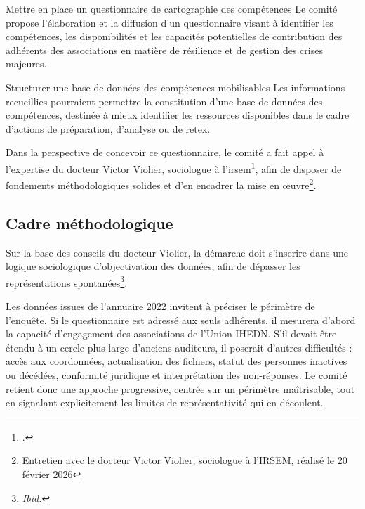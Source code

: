 \documentclass[12pt,a4paper]{article}
\newcommand{\UnionIHEDN}{Union-IHEDN}
\newcommand{\AssociationsUnionIHEDN}{associations de l'\UnionIHEDN}
\begin{document}
\begin{proposition}{Mettre en place un questionnaire de cartographie des compétences}
Le comité propose l'élaboration et la diffusion d'un questionnaire visant à identifier les compétences, les disponibilités et les capacités potentielles de contribution des adhérents des associations en matière de résilience et de gestion des crises majeures.
\end{proposition}

\begin{proposition}{Structurer une base de données des compétences mobilisables}
Les informations recueillies pourraient permettre la constitution d'une base de données des compétences, destinée à mieux identifier les ressources disponibles dans le cadre d'actions de préparation, d'analyse ou de \acrshort{retex}.
\end{proposition}

Dans la perspective de concevoir ce questionnaire, le comité a fait appel à l'expertise du docteur Victor Violier, sociologue à l'\gls{irsem}\footcite{violier_irsem}, afin de disposer de fondements méthodologiques solides et d'en encadrer la mise en \oe{}uvre\footnote{Entretien avec le docteur Victor Violier, sociologue à l'IRSEM, réalisé le 20 février 2026}.

\clearpage

\subsection{Cadre méthodologique}

Sur la base des conseils du docteur Violier, la démarche doit s'inscrire dans une logique sociologique d'objectivation des données, afin de dépasser les représentations spontanées\footnote{\textit{Ibid.}}.

Les données issues de l'annuaire 2022 invitent à préciser le périmètre de l'enquête. Si le questionnaire est adressé aux seuls adhérents, il mesurera d'abord la capacité d'engagement des \AssociationsUnionIHEDN. S'il devait être étendu à un cercle plus large d'anciens auditeurs, il poserait d'autres difficultés : accès aux coordonnées, actualisation des fichiers, statut des personnes inactives ou décédées, conformité juridique et interprétation des non-réponses. Le comité retient donc une approche progressive, centrée sur un périmètre maîtrisable, tout en signalant explicitement les limites de représentativité qui en découlent.
\end{document}
